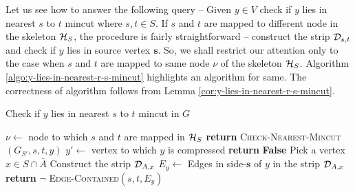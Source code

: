 Let us see how to answer the following query -- Given $y \in V$ check if $y$ lies in nearest $s$ to $t$ mincut where $s,t \in S$. If $s$ and $t$ are mapped to different node in the skeleton ${\cal H}_S$, the procedure is fairly straightforward -- construct the strip ${\cal D}_{s,t}$ and check if $y$ lies in source vertex $\mathbf{s}$. So, we shall restrict our attention only to the case when $s$ and $t$ are mapped to same node $\nu$ of the skeleton ${\cal H}_S$. Algorithm \ref{algo:y-lies-in-nearest-r-s-mincut} highlights an algorithm for same. The correctness of algorithm follows from Lemma \ref{cor:y-lies-in-nearest-r-s-mincut}.

\begin{algorithm}%
    \caption{Check if $y$ lies in nearest $s$ to $t$ mincut in $G$}
    \label{algo:y-lies-in-nearest-r-s-mincut}
    \begin{algorithmic}[1] %
             
            \EndIf
            \State $\nu \gets$  node to which $s$ and $t$ are mapped in ${\cal H}_S$
             \textbf{return} \textsc{Check-Nearest-Mincut}$(G_{S'},s,t,y)$
            \State $y' \gets$ vertex to which $y$ is compressed 
            \State \textbf{return} \textbf{False}
            \EndIf
            \State Pick a vertex $x \in S \cap {\bar A}$
            \State Construct the strip ${\cal D}_{A,x}$
            \State $E_y \gets$ Edges in side-$\mathbf{s}$ of $y$ in the strip ${\cal D}_{A,x}$
            \State \textbf{return} $\neg$ \textsc{Edge-Contained}$(s,t,E_y)$
        \EndProcedure
    \end{algorithmic}
\end{algorithm}